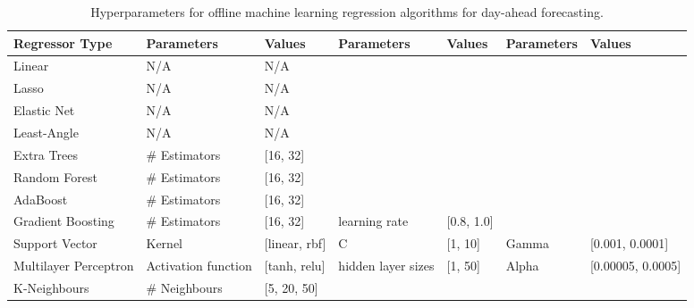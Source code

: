 \begin{table}
	\centering
	\begin{tabular}{@{}lllllll@{}}
		\toprule
		\textbf{Regressor Type} & \textbf{Parameters} & \textbf{Values}   & \textbf{Parameters} & \textbf{Values} & \textbf{Parameters} & \textbf{Values}       \\ \midrule
		Linear                  & N/A                 & N/A               &                     &                 &                     &                       \\
		Lasso                   & N/A                 & N/A               &                     &                 &                     &                       \\
		Elastic Net             & N/A                 & N/A               &                     &                 &                     &                       \\
		Least-Angle             & N/A                 & N/A               &                     &                 &                     &                       \\
		Extra Trees             & \# Estimators       & {[}16, 32{]}      &                     &                 &                     &                       \\
		Random Forest           & \# Estimators       & {[}16, 32{]}      &                     &                 &                     &                       \\
		AdaBoost                & \# Estimators       & {[}16, 32{]}      &                     &                 &                     &                       \\
		Gradient Boosting       & \# Estimators       & {[}16, 32{]}      & learning rate       & {[}0.8, 1.0{]}  &                     &                       \\
		Support Vector          & Kernel              & {[}linear, rbf{]} & C                   & {[}1, 10{]}     & Gamma               & {[}0.001, 0.0001{]}   \\
		Multilayer Perceptron   & Activation function & {[}tanh, relu{]}  & hidden layer sizes  & {[}1, 50{]}     & Alpha               & {[}0.00005, 0.0005{]} \\
		K-Neighbours            & \# Neighbours       & {[}5, 20, 50{]}   &                     &                 &                     &                       \\ \bottomrule
	\end{tabular}%
	\caption{Hyperparameters for offline machine learning regression algorithms for day-ahead forecasting.}
	\label{table:hyperparameter-tuning-offline}
	

\end{table}
